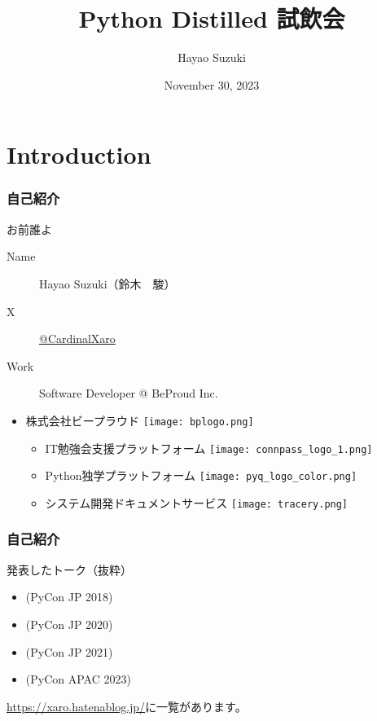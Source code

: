 \documentclass[aspectratio=169,dvipdfmx,12pt,notheorems]{beamer}
\title{Python Distilled 試飲会}
\author[Hayao]{Hayao Suzuki}
\institute[BPStudy \#195]{BPStudy \#195}
\date{November 30, 2023}
\theoremstyle{definition}
\begin{document}
\begin{frame}[plain]\frametitle{}
\titlepage %
\end{frame}


\section{Introduction}

\begin{frame}\frametitle{自己紹介}

\begin{block}{お前誰よ}
\begin{description}
\item[Name] Hayao Suzuki（鈴木　駿）
\item[ X] \href{https://twitter.com/CardinalXaro}{@CardinalXaro}
\item[Work] Software Developer @ BeProud Inc.
\end{description}
\end{block}

\begin{center}
\begin{itemize}
\item 株式会社ビープラウド \texttt{[image: bplogo.png]} 
\begin{itemize}
\item IT勉強会支援プラットフォーム \texttt{[image: connpass\_logo\_1.png]}
\item Python独学プラットフォーム \texttt{[image: pyq\_logo\_color.png]} 
\item システム開発ドキュメントサービス \texttt{[image: tracery.png]} 
\end{itemize}
\end{itemize}
\end{center}

\end{frame}

\begin{frame}\frametitle{自己紹介}

\begin{block}{発表したトーク（抜粋）}
\begin{itemize}
\item {}(PyCon JP 2018)
\item {}(PyCon JP 2020)
\item {}(PyCon JP 2021)
\item {}(PyCon APAC 2023)
\end{itemize}
\end{block}
\url{https://xaro.hatenablog.jp/}に一覧があります。
\end{frame}
\end{document}
